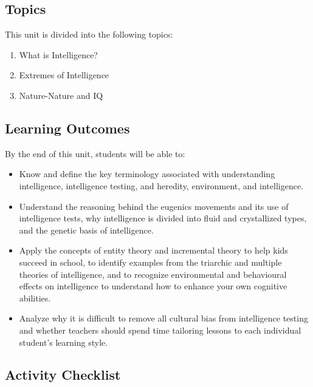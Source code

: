 \documentclass[
]{book}
\providecommand{\tightlist}{%
  \setlength{\itemsep}{0pt}\setlength{\parskip}{0pt}}
\begin{document}
\hypertarget{topics-1}{%
\subsection*{Topics}\label{topics-1}}

This unit is divided into the following topics:

\begin{enumerate}
\def\labelenumi{\arabic{enumi}.}
\tightlist
\item
  What is Intelligence?
\item
  Extremes of Intelligence
\item
  Nature-Nature and IQ
\end{enumerate}

\hypertarget{learning-outcomes-1}{%
\subsection*{Learning Outcomes}\label{learning-outcomes-1}}

By the end of this unit, students will be able to:

\begin{itemize}
\tightlist
\item
  Know and define the key terminology associated with understanding intelligence, intelligence testing, and heredity, environment, and intelligence.\\
\item
  Understand the reasoning behind the eugenics movements and its use of intelligence tests, why intelligence is divided into fluid and crystallized types, and the genetic basis of intelligence.\\
\item
  Apply the concepts of entity theory and incremental theory to help kids succeed in school, to identify examples from the triarchic and multiple theories of intelligence, and to recognize environmental and behavioural effects on intelligence to understand how to enhance your own cognitive abilities.\\
\item
  Analyze why it is difficult to remove all cultural bias from intelligence testing and whether teachers should spend time tailoring lessons to each individual student's learning style.
\end{itemize}

\hypertarget{activity-checklist-1}{%
\subsection*{Activity Checklist}\label{activity-checklist-1}}
\end{document}

